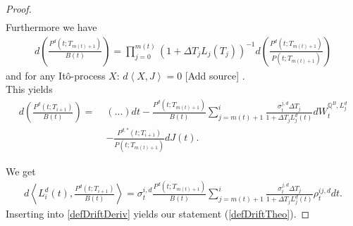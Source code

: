\documentclass[12pt]{article}
\begin{document}
\begin{proof}
\begin{align*}
		\end{align*}
		Furthermore we have
		\begin{align*}
			d\left(\frac{P^d(t;T_{m(t)+1})}{B(t)}\right) = \prod_{j=0}^{m(t)}(1+\Delta T_j L_j(T_j))^{-1}
			d\left(\frac{P^d(t;T_{m(t)+1})}{P(t;T_{m(t)+1})}\right)
		\end{align*}
		and for any Itô-process $X$: $ d\left\langle X, J\right \rangle = 0$ \color{red}[Add source]\color{black} %
		.\\
		This yields
		\begin{align*}
			d\left(\frac{P^d(t;T_{i+1})}{B(t)}\right) = \;& 
			 (...)dt - \frac{P^d(t;T_{m(t)+1})}{B(t)} \sum_{j=m(t)+1}^{i}\frac{\sigma^{j, d}_t \Delta T_j}{1 + \Delta T_j L^d_j(t)} dW^{\mathbb{Q}^B, L^d_j}_t \\
			 & - \frac{P^{d,*}(t;T_{i + 1})}{P(t;T_{m(t)+1})}dJ(t).
		\end{align*}
		
		We get 
		\begin{align*}
			d\left\langle  L_i^d(t), \frac{P^d(t;T_{i+1})}{B(t)} \right\rangle = \sigma^{i, d}_t \frac{P^d(t;T_{m(t)+1})}{B(t)} \sum_{j=m(t)+1}^{i}\frac{\sigma^{j, d}_t\Delta T_j}{1 + \Delta T_j L^d_j(t)}\rho^{i j, d}_t  dt.
		\end{align*}
		Inserting into \cref{defDriftDeriv} yields our statement (\ref{defDriftTheo}).
	\end{proof}
	
\end{document}
